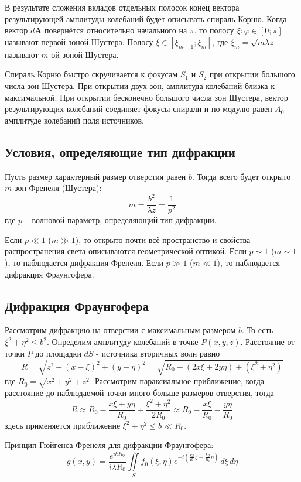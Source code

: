 В результате сложения вкладов отдельных полосок конец вектора 
результирующей амплитуды колебаний будет описывать спираль 
Корню. Когда вектор $d \boldsymbol{A}$ повернётся 
относительно начального на $\pi$, то полосу $\xi: \varphi \in 
[0; \pi]$ называют первой зоной Шустера. Полосу $\xi \in 
[\xi_{m-1}; \xi_m]$, где $\xi_m = \sqrt{m \lambda z}$ 
называют $m$-ой зоной Шустера.

Спираль Корню быстро скручивается к фокусам $S_1$ и $S_2$ при открытии большого числа зон Шустера. При открытии двух зон, амплитуда колебаний близка к максимальной. При открытии бесконечно большого числа зон Шустера, вектор результирующих колебаний соединяет фокусы спирали и по модулю равен $A_0$ - амплитуде колебаний поля источников.

\subsection*{Условия, определяющие тип дифракции}

Пусть размер характерный размер отверстия равен $b$. Тогда всего будет открыто $m$ зон Френеля (Шустера):
$$
m = \frac{b^2}{\lambda z} = \frac{1}{p^2}
$$
где $p$ -- волновой параметр, определяющий тип дифракции.

Если $p \ll 1$ ($m \gg 1$), то открыто почти всё пространство и свойства распространения света описываются геометрической оптикой. Если $p \sim 1$ ($m \sim 1$), то наблюдается дифракция Френеля. Если $p \gg 1$ ($m \ll 1$), то наблюдается дифракция Фраунгофера.

\subsection*{Дифракция Фраунгофера}

Рассмотрим дифракцию на отверстии с максимальным размером $b$. То есть $\xi^2 + \eta^2 \le b^2$. Определим амплитуду колебаний в точке $P(x, y, z)$. Расстояние от точки $P$ до площадки $dS$ - источника вторичных волн равно
$$
R = \sqrt{z^2 + (x - \xi)^2 + (y - \eta)^2} = \sqrt{R_0 - (2x \xi + 2 y \eta) + (\xi^2 + \eta^2)}
$$
где $R_0 = \sqrt{x^2 + y^2 + z^2}$. Рассмотрим параксиальное приближение, когда расстояние до наблюдаемой точки много больше размеров отверстия, тогда
$$
R \approx R_0 - \frac{x\xi + y \eta}{R_0} + \frac{\xi^2 + \eta^2}{2R_0} \approx  R_0 - \frac{x\xi}{R_0} - \frac{y \eta}{R_0}
$$
здесь применяется приближение $\xi^2 + \eta^2 \le b \ll R_0$.

Принцип Гюйгенса-Френеля для дифракции Фраунгофера:
$$
g(x, y) = \frac{e^{i kR_0}}{i \lambda R_0} \iint \limits_S f_0(\xi, \eta) e^{-i \left(\frac{kx}{R_0}\xi + \frac{ky}{R_0}\eta\right)} \, d\xi \, d\eta
$$

